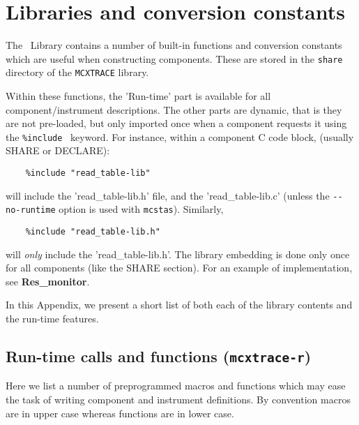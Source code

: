 
\chapter{Libraries and conversion constants}
\label{c:kernelcalls}

The \MCX\ Library contains a number of built-in functions
and conversion constants which are useful when constructing
components. These are stored in the \verb+share+ directory of
the \verb+MCXTRACE+ library. 

Within these functions, the 'Run-time' part is available for all
component/instrument descriptions. The other parts
are dynamic, that is they are not
pre-loaded, but only imported once when a component requests it
using the \verb+%include+ \MCX\ keyword. For instance, within a
component C code block, (usually SHARE or DECLARE):
\begin{verbatim}
    %include "read_table-lib"
\end{verbatim}
will include the 'read\_table-lib.h' file, and the 'read\_table-lib.c'
(unless the \verb+--no-runtime+ option is used with \verb+mcstas+).
Similarly,
\begin{verbatim}
    %include "read_table-lib.h"
\end{verbatim}
will \emph{only} include the 'read\_table-lib.h'.
The library embedding is done only once for all components (like the
 SHARE section).  For an example
of implementation, see {\bfseries Res\_monitor}.

In this Appendix, we present a short list of both each of the library contents
and the run-time features.

\section{Run-time calls and functions (\texttt{mcxtrace-r})}
\label{s:calls:run-time}
Here we list a number of preprogrammed macros and functions
which may ease the task of writing component and instrument definitions.
By convention macros are in upper case whereas functions are in lower case.

